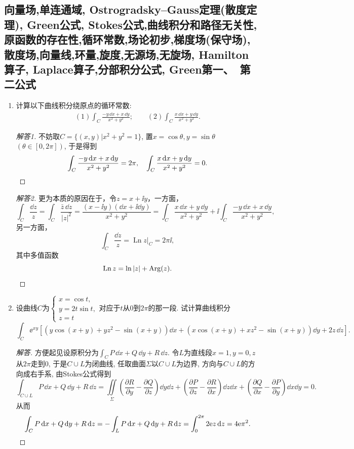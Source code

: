 \subsection{向量场,单连通域, Ostrogradsky--Gauss定理(散度定理), Green公式, Stokes公式,曲线积分和路径无关性,原函数的存在性,循环常数,场论初步,梯度场(保守场),散度场,向量线,环量,旋度,无源场,无旋场, Hamilton算子, Laplace算子,分部积分公式, Green第一、\ 第二公式}
\begin{quiza}
\begin{enumerate}
\item 计算以下曲线积分绕原点的循环常数:
\begin{align*}
(1)\int_{C}\frac{-y\,\dd x+x\,\dd y}{x^2+y^2};\qquad
(2)\int_{C}\frac{x\,\dd x+y\,\dd y}{x^2+y^2}.
\end{align*}
\begin{proof}[解答1]
不妨取\(C=\{(x,y)\big|x^2+y^2=1\}\), 置\(x=\cos\theta,y=\sin\theta\) \((\theta\in[0,2\pi])\), 于是得到
\[\int_C\frac{-y\,\mathrm{d} x+x\,\mathrm{d} y}{x^2+y^2}=2\pi,\quad\int_{C}\frac{x\,\mathrm{d} x+y\,\mathrm{d} y}{x^2+y^2}=0.\qedhere\]
\end{proof}
\begin{proof}[解答2]
更为本质的原因在于，令$z=x+\ii y$，一方面，
\[\int_C\frac{\dd z}{z}=\int_C\frac{\bar{z}\,\dd z}{|z|^2}
=\frac{(x-\ii y)(\dd x+\ii\dd y)}{x^2+y^2}
=\int_{C}\frac{x\,\dd x+y\,\dd y}{x^2+y^2}+\ii\int_{C}\frac{-y\,\dd x+x\,\dd y}{x^2+y^2},\]
另一方面，
\[\int_C\frac{\dd z}{z}=\operatorname{Ln}z\big|_C=2\pi\ii,\]
其中多值函数\[\operatorname{Ln}z=\ln|z|+\operatorname{Arg}(z).\qedhere\]
\end{proof}

\item 设曲线\(C\)为\(\begin{cases}
x=\cos t,\\y=2t\sin t,\\z=t
\end{cases}\)对应于\(t\)从\(0\)到\(2\pi\)的那一段. 试计算曲线积分
\[\int_C\ee^{xy}\left[\left(y\cos(x+y)+yz^2-\sin(x+y)\right)\dd x
+\left(x\cos(x+y)+xz^2-\sin(x+y)\right)\dd y+2z\,\dd z \right].\]
\begin{proof}[解答]
方便起见设原积分为\(\int_CP\,\dd x+Q\,\dd y+R\,\dd z\). 
令\(L\)为直线段\(x=1,y=0,z\)从\(2\pi\)走到\(0\), 于是\(C\cup L\)为闭曲线, 
任取曲面\(\varSigma\)以\(C\cup L\)为边界, 方向与\(C\cup L\)的方向成右手系, 
由Stokes公式得到\[\int_{C\cup L}P\,\dd x+Q\,\dd y+R\,\dd z
=\iint\limits_{\varSigma}\left(\frac{\partial R}{\partial y}
-\frac{\partial Q}{\partial z}\right)\dd y\dd z
+\left(\frac{\partial P}{\partial z}-\frac{\partial R}{\partial x}\right)\dd z\dd x
+\left(\frac{\partial Q}{\partial x}-\frac{\partial P}{\partial y}\right)\dd x\dd y=0.\]
从而\[\int_CP\,\mathrm{d} x+Q\,\mathrm{d} y+R\,\mathrm{d} z=-\int_LP\,\mathrm{d} x+Q\,\mathrm{d} y+R\,\mathrm{d} z
=\int_{0}^{2\pi}2\mathrm{e} z\,\mathrm{d} z=4\mathrm{e}\pi^2.\qedhere\]
\end{proof}


\end{enumerate}
\end{quiza}
